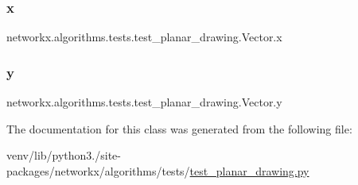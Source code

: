\subsubsection{\texorpdfstring{x}{x}}
{\footnotesize\ttfamily networkx.\+algorithms.\+tests.\+test\+\_\+planar\+\_\+drawing.\+Vector.\+x}

\mbox{\label{classnetworkx_1_1algorithms_1_1tests_1_1test__planar__drawing_1_1Vector_a0bf8986b1ca75c5c689d13a5c9fbf934}} 
\subsubsection{\texorpdfstring{y}{y}}
{\footnotesize\ttfamily networkx.\+algorithms.\+tests.\+test\+\_\+planar\+\_\+drawing.\+Vector.\+y}



The documentation for this class was generated from the following file\+:\begin{DoxyCompactItemize}
\item 
venv/lib/python3./site-\/packages/networkx/algorithms/tests/\hyperlink{test__planar__drawing_8py}{test\+\_\+planar\+\_\+drawing.\+py}\end{DoxyCompactItemize}
